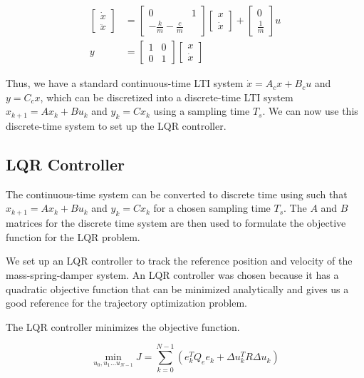 \documentclass{article}
\begin{document}
$$
\begin{aligned}
  \begin{bmatrix}
    \dot{x} \\
    \ddot{x}
  \end{bmatrix} &=
  \begin{bmatrix}
    0 & 1 \\
    -\frac{k}{m}  -\frac{c}{m}
  \end{bmatrix}
  \begin{bmatrix}
    x \\
    \dot{x}
  \end{bmatrix} +
  \begin{bmatrix}
    0 \\
    \frac{1}{m}
  \end{bmatrix} u \\
  y &=
  \begin{bmatrix}
    1 & 0 \\
    0 & 1
  \end{bmatrix}
  \begin{bmatrix}
    x \\
    \dot{x}
  \end{bmatrix}
\end{aligned}
$$

Thus, we have a standard continuous-time LTI system $\dot{x} = A_cx + B_cu$ and $y = C_cx$, which can be discretized
into a discrete-time LTI system $x_{k+1} = Ax_k + Bu_k$ and $y_k = Cx_k$ using a sampling time $T_s$. We can now use
this discrete-time system to set up the LQR controller.

\subsection{LQR Controller} \label{lqr_ctrl}
The continuous-time system can be converted to discrete time using such that $x_{k+1} = A x_k + B u_k$ and $y_k = C x_k$ for a chosen sampling time $T_s$.
The $A$ and $B$ matrices for the discrete time system are then used to formulate the objective function for the LQR problem.

We set up an LQR controller to track the reference position and velocity of the mass-spring-damper system.
An LQR controller was chosen because it has a quadratic objective function that can be minimized analytically and gives us a
good reference for the trajectory optimization problem.

The LQR controller minimizes the objective function.

$$
\min_{u_0, u_1 ... u_{N-1}}J = \sum_{k=0}^{N-1} (e_k^T Q_e e_k + \Delta u_k^T R \Delta u_k)
$$
\end{document}
